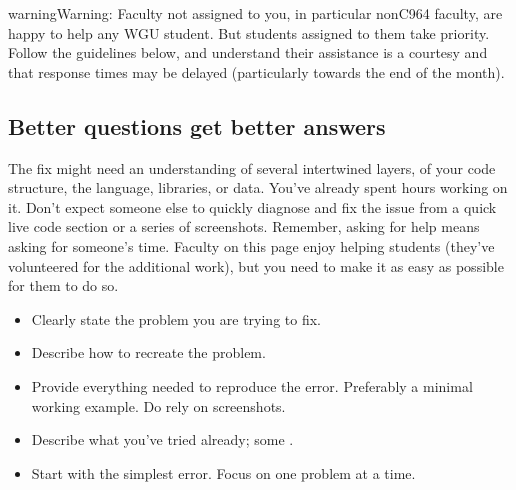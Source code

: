 \documentclass[letterpaper,10pt,english]{jupyterBook}
\begin{document}
\label{\detokenize{ci_other:ci-other}}
\begin{sphinxadmonition}{warning}{Warning:}
\sphinxAtStartPar
Faculty not assigned to you, in particular non\sphinxhyphen{}C964 faculty,  are happy to help any WGU student. But students assigned to them take priority.  Follow the guidelines below, and understand their assistance is a courtesy and that response times may be delayed (particularly towards the end of the month).
\end{sphinxadmonition}


\subsection{Better questions get better answers}
\label{\detokenize{ci_other:better-questions-get-better-answers}}\label{\detokenize{ci_other:ci-other-better-questions-get-better-answers}}
\sphinxAtStartPar
The fix might need an understanding of several intertwined layers, of your code structure, the language, libraries, or data. You’ve already spent hours working on it. Don’t expect someone else to quickly diagnose and fix the issue from a quick live code section or a series of screenshots. Remember, asking for help means asking for someone’s time. Faculty on this page enjoy helping students (they’ve volunteered for the additional work), but you need to make it as easy as possible for them to do so.

\sphinxAtStartPar
{}
\begin{itemize}
\item {} 
\sphinxAtStartPar
Clearly state the problem you are trying to fix.

\item {} 
\sphinxAtStartPar
Describe how to recreate the problem.

\item {} 
\sphinxAtStartPar
Provide everything needed to reproduce the error. Preferably a minimal working example. Do  rely on screenshots.

\item {} 
\sphinxAtStartPar
Describe what you’ve tried already; some .

\item {} 
\sphinxAtStartPar
Start with the simplest error. Focus on one problem at a time.

\end{itemize}
\end{document}
